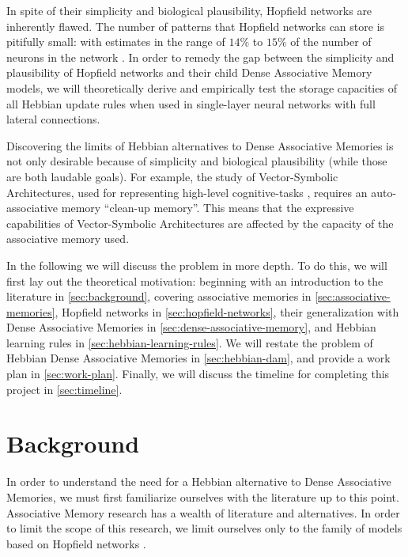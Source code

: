 \documentclass{article}
\theoremstyle{definition}
\begin{document}
In spite of their simplicity and biological plausibility, Hopfield networks
are inherently flawed. The number of patterns that Hopfield networks
can store is pitifully small: with estimates in the range of $14\%$ to $15\%$
of the number of neurons in the network
\parencites{hopfield_neural_1982,amit_statistical_1987}.
In order to remedy the gap between the simplicity and plausibility of
Hopfield networks
and their child Dense Associative Memory models, we will theoretically derive
and empirically test the storage capacities of all Hebbian update rules
when used in single-layer neural networks with full lateral connections.

Discovering the limits of Hebbian alternatives to Dense Associative Memories
is not only desirable because of simplicity and biological plausibility
(while those are both laudable goals). For example, the study of
Vector-Symbolic Architectures, used for representing high-level cognitive-tasks
\parencites{smolensky_tensor_1990,plate_holographic_1995,gayler_multiplicative_1998},
requires an auto-associative memory ``clean-up memory''. This means that
the expressive capabilities of Vector-Symbolic Architectures are
affected by the capacity of the associative memory used.

In the following we will discuss the problem in more depth. To do
this, we will first
lay out the theoretical motivation: beginning with an introduction to
the literature
in \autoref{sec:background}, covering associative memories in
\autoref{sec:associative-memories},
Hopfield networks in \autoref{sec:hopfield-networks}, their generalization with
Dense Associative Memories in \autoref{sec:dense-associative-memory},
and Hebbian learning rules in \autoref{sec:hebbian-learning-rules}. We will restate the
problem of Hebbian Dense Associative Memories in \autoref{sec:hebbian-dam}, and
provide a work plan in \autoref{sec:work-plan}. Finally, we will discuss
the timeline for completing this project in \autoref{sec:timeline}.

\section{Background}\label{sec:background}

In order to understand the need for a Hebbian alternative to Dense Associative
Memories, we must first familiarize ourselves with the literature up to this
point. Associative Memory research has a wealth of literature and alternatives.
In order to limit the scope of this research, we limit ourselves only to the
family of models based on Hopfield networks \parencite{hopfield_neural_1982}.
\end{document}
